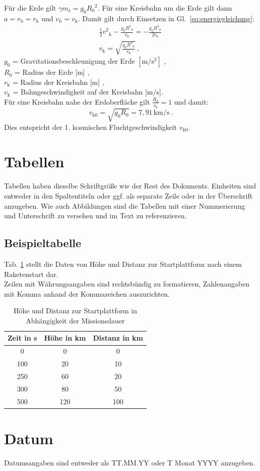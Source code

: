 Für die Erde gilt $\gamma   m_{\textrm{z}} = g_0   {R_0}^2$. Für eine Kreisbahn um die Erde gilt dann $a=r_{\textrm{b}}=r_{\textrm{k}}$ und $v_{\textrm{b}} = v_{\textrm{k}}$. Damit gilt durch Einsetzen in Gl.~\ref{eq:energiegleichung}:
\begin{align}
	\frac{1}{2}   {v^2}_{\textrm{k}} - \frac{g_0 {R^2}_0}{r_{\textrm{k}}} = -\frac{{g_0   {R^2}_0}}{2    r_{\textrm{k}}} \, \\
	v_{\textrm{k}} = \sqrt{\frac{g_0   {R^2}_0}{r_{\textrm{k}}}} \ , 
	\label{eq:engergiegleichung2}
\end{align}
$g_0$ = Gravitationsbeschleunigung der Erde $\mathrm{[m/s^2]}$ , \\
$R_0$ = Radius der Erde [m] ,\\
$r_{\textrm{k}}$ = Radius der Kreisbahn [m] , \\
$v_{\textrm{k}}$ = Bahngeschwindigkeit auf der Kreisbahn [m/s]. \\

Für eine Kreisbahn nahe der Erdoberfläche gilt $\frac{R_0}{r_{\textrm{k}}} = 1$ und damit:
\begin{equation}
v_{{\textrm{k}}0} = \sqrt{g_0   R_0} = 7,91\,\mathrm{km/s} \ . 
\label{nocheinegleichung}
\end{equation}
Dies entspricht der 1. kosmischen Fluchtgeschwindigkeit $v_{{\textrm{k}}0}$.

\section{Tabellen}
\label{subsec:tabelle}
Tabellen haben dieselbe Schriftgröße wie der Rest des Dokuments. Einheiten sind entweder in den Spaltentiteln oder ggf. als separate Zeile oder in der Überschrift anzugeben.
Wie auch Abbildungen sind die Tabellen mit einer Nummerierung und Unterschrift zu versehen und im Text zu referenzieren.

\subsection{Beispieltabelle}
\label{subsec:beispieltabelle}
Tab. \ref{tab:startdaten} stellt die Daten von Höhe und Distanz zur Startplattform nach einem Raketenstart dar.\\
Zeilen mit Währungsangaben sind rechtsbündig zu formatieren, Zahlenangaben mit Komma anhand der Kommazeichen auszurichten.
 
\begin{table}[htbp]
	\centering
	\caption{Höhe und Distanz zur Startplattform in Abhängigkeit der Missionsdauer}
		\begin{tabular}{ccc} \hline
		\textbf{Zeit in s} & \textbf{Höhe in km} & \textbf{Distanz in km} \\ \hline 
		0 & 0 & 0 \\ 
		100  & 20 & 10 \\ 
		250 & 60 & 20 \\ 
		300 & 80 & 50 \\ 
		500 & 120 & 100 \\  \hline
	\end{tabular}
	\label{tab:startdaten}%
\end{table}

\section{Datum}
\label{subsec:Datum}
Datumsangaben sind entweder als TT.MM.YY oder T Monat YYYY anzugeben.